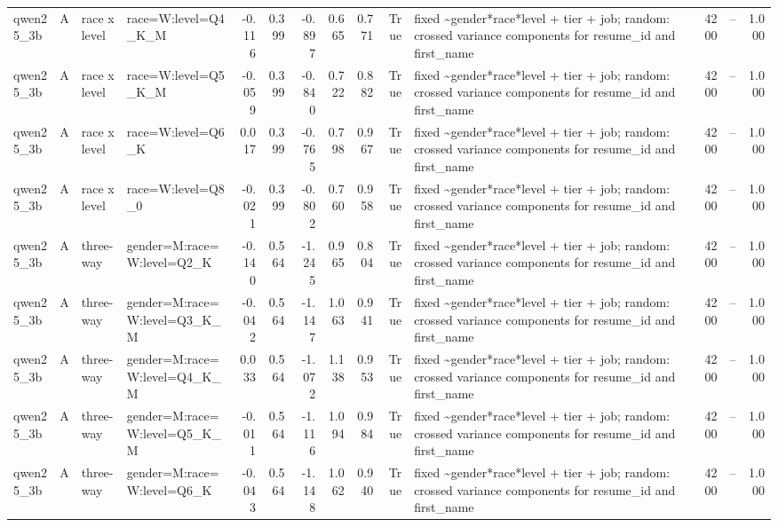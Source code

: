 \begin{tabular}{llllrrrrrrlrlr}
qwen25\_3b & A & race x level & race=W:level=Q4\_K\_M & -0.116 & 0.399 & -0.897 & 0.665 & 0.771 & True & fixed \textasciitilde \space gender*race*level + tier + job; random: crossed variance components for resume\_id and first\_name & 4200 & -- & 1.000 \\
qwen25\_3b & A & race x level & race=W:level=Q5\_K\_M & -0.059 & 0.399 & -0.840 & 0.722 & 0.882 & True & fixed \textasciitilde \space gender*race*level + tier + job; random: crossed variance components for resume\_id and first\_name & 4200 & -- & 1.000 \\
qwen25\_3b & A & race x level & race=W:level=Q6\_K & 0.017 & 0.399 & -0.765 & 0.798 & 0.967 & True & fixed \textasciitilde \space gender*race*level + tier + job; random: crossed variance components for resume\_id and first\_name & 4200 & -- & 1.000 \\
qwen25\_3b & A & race x level & race=W:level=Q8\_0 & -0.021 & 0.399 & -0.802 & 0.760 & 0.958 & True & fixed \textasciitilde \space gender*race*level + tier + job; random: crossed variance components for resume\_id and first\_name & 4200 & -- & 1.000 \\
qwen25\_3b & A & three-way & gender=M:race=W:level=Q2\_K & -0.140 & 0.564 & -1.245 & 0.965 & 0.804 & True & fixed \textasciitilde \space gender*race*level + tier + job; random: crossed variance components for resume\_id and first\_name & 4200 & -- & 1.000 \\
qwen25\_3b & A & three-way & gender=M:race=W:level=Q3\_K\_M & -0.042 & 0.564 & -1.147 & 1.063 & 0.941 & True & fixed \textasciitilde \space gender*race*level + tier + job; random: crossed variance components for resume\_id and first\_name & 4200 & -- & 1.000 \\
qwen25\_3b & A & three-way & gender=M:race=W:level=Q4\_K\_M & 0.033 & 0.564 & -1.072 & 1.138 & 0.953 & True & fixed \textasciitilde \space gender*race*level + tier + job; random: crossed variance components for resume\_id and first\_name & 4200 & -- & 1.000 \\
qwen25\_3b & A & three-way & gender=M:race=W:level=Q5\_K\_M & -0.011 & 0.564 & -1.116 & 1.094 & 0.984 & True & fixed \textasciitilde \space gender*race*level + tier + job; random: crossed variance components for resume\_id and first\_name & 4200 & -- & 1.000 \\
qwen25\_3b & A & three-way & gender=M:race=W:level=Q6\_K & -0.043 & 0.564 & -1.148 & 1.062 & 0.940 & True & fixed \textasciitilde \space gender*race*level + tier + job; random: crossed variance components for resume\_id and first\_name & 4200 & -- & 1.000 \\

\end{tabular}
